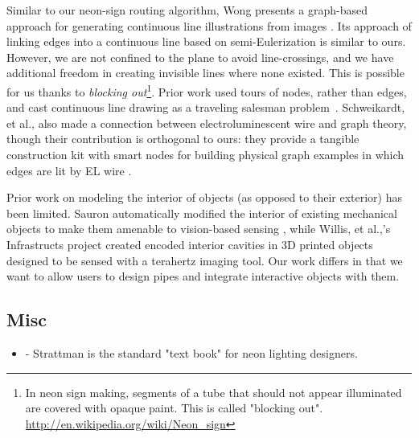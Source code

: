 Similar to our neon-sign routing algorithm, Wong presents a graph-based approach for generating continuous line illustrations from images \cite{Wong-continuousline}. Its approach of linking edges into a continuous line based on semi-Eulerization is similar to ours.  However, we are not confined to the plane to avoid line-crossings, and we have additional freedom in creating invisible lines where none existed.  This is possible for us thanks to \emph{blocking out}\footnote{In neon sign making, segments of a tube that should not appear illuminated are covered with opaque paint. This is called "blocking out". \url{http://en.wikipedia.org/wiki/Neon_sign}}. Prior work used tours of nodes, rather than edges, and cast continuous line drawing as a traveling salesman problem~\cite{Bosch-tsp}.  Schweikardt, et al., also made a connection between electroluminescent wire and graph theory, though their contribution is orthogonal to ours: they provide a tangible construction kit with smart nodes for building physical graph examples in which edges are lit by EL wire \cite{Schweikardt-tei09}.

Prior work on modeling the interior of objects (as opposed to their exterior) has been limited.    Sauron automatically modified the interior of existing mechanical objects to make them amenable to vision-based sensing \cite{Savage-sauron}, while Willis, et al.,'s Infrastructs project created encoded interior cavities in 3D printed objects designed to be sensed with a terahertz imaging tool.  Our work differs in that we want to allow users to design pipes and integrate interactive objects with them.

\subsection{Misc}
\begin{itemize}
\item \cite{strattman1997neon} - Strattman is the standard "text book" for neon lighting designers.
\end{itemize}